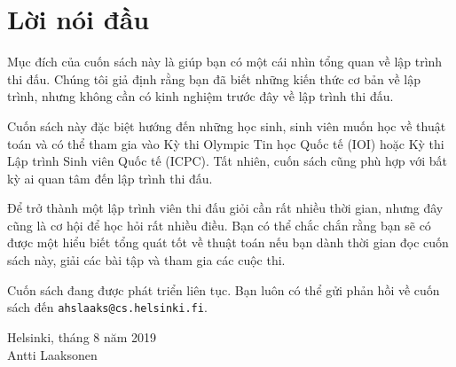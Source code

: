\chapter*{Lời nói đầu}

Mục đích của cuốn sách này là giúp bạn
có một cái nhìn tổng quan về lập trình thi đấu.
Chúng tôi giả định rằng bạn đã
biết những kiến thức cơ bản về lập trình, nhưng không cần
có kinh nghiệm trước đây về lập trình thi đấu.

Cuốn sách này đặc biệt hướng đến
những học sinh, sinh viên muốn học về thuật toán và
có thể tham gia vào
Kỳ thi Olympic Tin học Quốc tế (IOI) hoặc
Kỳ thi Lập trình Sinh viên Quốc tế (ICPC).
Tất nhiên, cuốn sách cũng phù hợp với
bất kỳ ai quan tâm đến lập trình thi đấu.

Để trở thành một lập trình viên thi đấu giỏi cần rất nhiều thời gian,
nhưng đây cũng là cơ hội để học hỏi rất nhiều điều.
Bạn có thể chắc chắn rằng bạn sẽ
có được một hiểu biết tổng quát tốt về thuật toán
nếu bạn dành thời gian đọc cuốn sách này,
giải các bài tập và tham gia các cuộc thi.

Cuốn sách đang được phát triển liên tục.
Bạn luôn có thể gửi phản hồi về cuốn sách đến
\texttt{ahslaaks@cs.helsinki.fi}.

\begin{flushright}
Helsinki, tháng 8 năm 2019 \\
Antti Laaksonen
\end{flushright}
